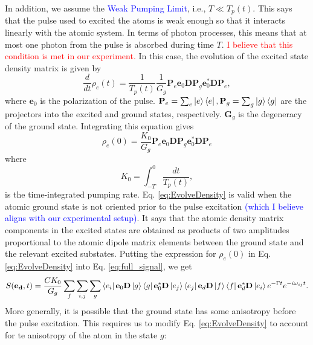 \documentclass[11pt]{article}
\newcommand{\f}[2]{\frac{#1}{#2}}
\begin{document}
\begin{appendices}
In addition, we assume the \textcolor{blue}{Weak Pumping Limit}, i.e., $T\ll T_p(t)$. This says that the pulse used to excited the atoms is weak enough so that it interacts linearly with the atomic system. In terms of photon processes, this means that at most one photon from the pulse is absorbed during time $T$. \textcolor{red}{I believe that this condition is met in our experiment.} In this case, the evolution of the excited state density matrix is given by
\begin{equation*}
\f{d}{dt} \rho_e(t) = \f{1}{T_p(t)} \f{1}{G_g} \mathbf{P}_e \mathbf{e}_0 \mathbf{D} \mathbf{P}_g \mathbf{e}_0^* \mathbf{D} \mathbf{P}_e,
\end{equation*}
where $\mathbf{e}_0$ is the polarization of the pulse. $\mathbf{P}_e = \sum_e \ket{e}\bra{e}, \mathbf{P}_g = \sum_g\ket{g}\bra{g}$ are the projectors into the excited and ground states, respectively. $\mathbf{G}_g$ is the degeneracy of the ground state. Integrating this equation gives
\begin{equation}\label{eq:EvolveDensity}
\rho_e(0) = \f{K_0}{G_g} \mathbf{P}_e \mathbf{e}_0 \mathbf{D} \mathbf{P}_g \mathbf{e}_0^* \mathbf{D} \mathbf{P}_e
\end{equation}
where
\begin{equation*}
K_0 = \int^0_{-T} \f{dt}{T_p(t)},
\end{equation*}
is the time-integrated pumping rate. Eq. \ref{eq:EvolveDensity} is valid when the atomic ground state is not oriented prior to the pulse excitation \textcolor{blue}{(which I believe aligns with our experimental setup)}. It says that the atomic density matrix components in the excited states are obtained as products of two amplitudes proportional to the atomic dipole matrix elements between the ground state and the relevant excited substates. Putting the expression for $\rho_e(0)$ in Eq. \ref{eq:EvolveDensity} into Eq. \ref{eq:full_signal}, we get
\begin{equation*}
S(\mathbf{e_d},t) = \f{CK_0}{G_g}\sum_f \sum_{i,j}\sum_g \bra{e_i} \mathbf{e}_0 \mathbf{D} \ket{g} \bra{g} \mathbf{e}_0^* \mathbf{D} \ket{e_j} \bra{e_j} \mathbf{e}_d \mathbf{D} \ket{f} \bra{f} \mathbf{e}_d^* \mathbf{D} \ket{e_i} e^{-\Gamma t}e^{-i\omega_{ij}t}.
\end{equation*}
More generally, it is possible that the ground state has some anisotropy before the pulse excitation. This requires us to modify Eq. \ref{eq:EvolveDensity} to account for te anisotropy of the atom in the state $g$:
\begin{equation}\label{eq:DensityEvolveModified}

\end{equation}
\end{appendices}
\end{document}
